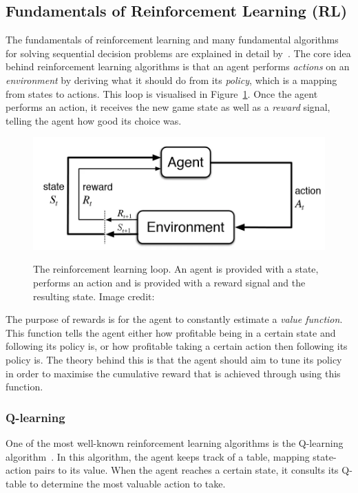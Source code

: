\documentclass[12pt,a4paper]{article}
\begin{document}
    \subsection{Fundamentals of Reinforcement Learning (RL)}\label{subsec:fundamentals}
    The fundamentals of reinforcement learning and many fundamental algorithms for solving sequential decision problems are explained in detail by~\citet{sutton18}.
    The core idea behind reinforcement learning algorithms is that an agent performs \emph{actions} on an \emph{environment} by deriving what it should do from its \emph{policy}, which is a mapping from states to actions.
    This loop is visualised in Figure~\ref{fig:rlgraph}.
    Once the agent performs an action, it receives the new game state as well as a \emph{reward} signal, telling the agent how good its choice was.

    \begin{figure}[ht]
        \caption[The reinforcement learning loop.]{The reinforcement learning loop. An agent is provided with a state, performs an action and is provided with a reward signal and the resulting state. Image credit: \citet{bhattrl}}
        \centering
        \includegraphics[scale=0.4]{rlgraph}
        \label{fig:rlgraph}
    \end{figure}

    The purpose of rewards is for the agent to constantly estimate a \emph{value function}.
    This function tells the agent either how profitable being in a certain state and following its policy is, or how profitable taking a certain action then following its policy is.
    The theory behind this is that the agent should aim to tune its policy in order to maximise the cumulative reward that is achieved through using this function.

    \subsubsection{Q-learning}
    One of the most well-known reinforcement learning algorithms is the Q-learning algorithm~\citep[chap.~6.5]{sutton18}.
    In this algorithm, the agent keeps track of a table, mapping state-action pairs to its value.
    When the agent reaches a certain state, it consults its Q-table to determine the most valuable action to take.
\end{document}
